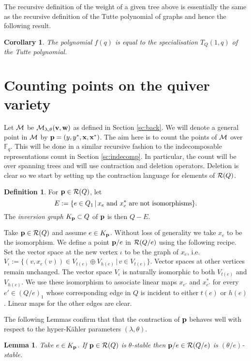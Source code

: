 \documentclass{amsart}
\newtheorem{cor}[thm]{Corollary}
\newtheorem{lem}[thm]{Lemma}
\theoremstyle{definition}
\newtheorem{defn}[thm]{Definition}
\begin{document}
The recursive definition of the weight of a given tree above is essentially the same as the recursive definition of the Tutte polynomial of graphs and hence the following result.

\begin{cor}
The polynomial $f(q)$ is equal to the specialisation $T_Q(1,q)$ of the Tutte polynomial.
\end{cor}


\section{Counting points on the quiver variety}

Let $\mathcal{M}$ be $\mathcal{M}_{\lambda, \theta}(\mathbf{v}, \mathbf{w})$ as defined in Section \ref{sc:back}. We will denote a general point in $\mathcal{M}$ by $\mathbf{p} = (y, y^*, \mathbf{x}, \mathbf{x}^*)$. 
The aim here is to count the points of $\mathcal{M}$ over $\mathbb{F}_q$. 
This will be done in a similar recursive fashion to the indecomposable representations count in Section \ref{sc:indecomp}.
In particular, the count will be over spanning trees and will use contraction and deletion operators.
Deletion is clear so we start by setting up the contraction language for elements of $\mathcal{R}(Q)$.

\begin{defn}
For $\mathbf{p} \in \mathcal{R}(Q)$, let $$E:=\{e\in Q_1 \,|\, x_e \textup{ and } x_e^* \textup{ are not isomorphisms}\}.$$   
The {\em inversion graph} $K_{\mathbf{p}} \subset Q$ of $\mathbf{p}$ is then $Q - E$.
\end{defn}

Take $\mathbf{p} \in \mathcal{R}(Q)$ and assume $e\in K_{\mathbf{p}}$.
Without loss of generality we take $x_e$ to be the isomorphism.
We define a point $\mathbf{p}/e$ in $\mathcal{R}(Q/e)$ using the following recipe.
Set the vector space at the new vertex $\iota$ to be the graph of $x_e$, i.e.\ $V_\iota := \{(v, x_e(v)) \in V_{t(e)} \oplus V_{h(e)} \, | \, v \in V_{t(e)}\}$.
Vector spaces at other vertices remain unchanged.
The vector space $V_\iota$ is naturally isomorphic to both $V_{t(e)}$ and $V_{h(e)}$.
We use these isomorphism to associate linear maps $x_{e'}$ and $x_{e'}^*$ for every $e' \in (Q/e)_1$ whose corresponding edge in $Q$ is incident to either $t(e)$ or $h(e)$.
Linear maps for the other edges are clear.

The following Lemmas confirm that that the contraction of $\mathbf{p}$ behaves well with respect to the hyper-K\"ahler parameters $(\lambda, \theta)$.

\begin{lem}
Take $e\in K_{\mathbf{p}}$. If $\mathbf{p} \in \mathcal{R}(Q)$ is $\theta$-stable then $\mathbf{p}/e \in \mathcal{R}(Q/e)$ is $(\theta/e)$-stable.
\end{lem}
\end{document}
